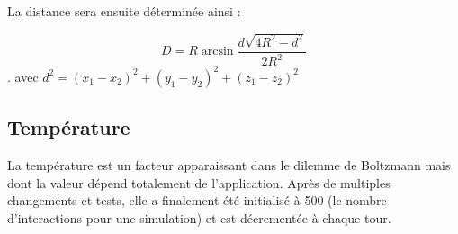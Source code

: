 La distance sera ensuite déterminée ainsi \cite{distance} :

\[ D = R\arcsin{\frac{d\sqrt{4R^2-d^2}}{2R^2}} \].
avec $ d^2 = (x_1-x_2)^2 + (y_1-y_2)^2 + (z_1-z_2)^2 $

\subsection{Température \cite{Dilemme}}
\label{sec:temperature}
La température est un facteur apparaissant dans le dilemme de Boltzmann mais dont la valeur dépend totalement de l'application.
Après de multiples changements et tests, elle a finalement été initialisé à 500 (le nombre d'interactions pour une simulation) et est décrementée à chaque tour.
